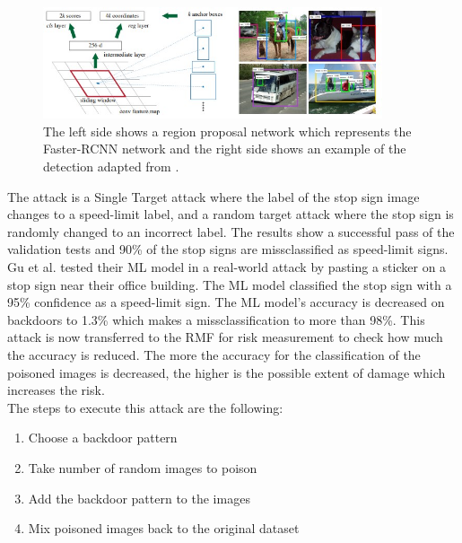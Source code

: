 \begin{figure}[ht!]
  \centering
  \includegraphics[width=10cm]{pictures/f_rcnn.jpg}
  \caption{The left side shows a region proposal network which represents the Faster-RCNN network and the right side shows an example of the detection adapted from \cite{DBLP:conf/nips/RenHGS15}.}
  \label{fig:f_rcnn}
\end{figure}

The attack is a Single Target attack where the label of the stop sign image changes to a speed-limit label, and a random target attack where the stop sign is randomly changed to an incorrect label. The results show a successful pass of the validation tests and 90\% of the stop signs are missclassified as speed-limit signs. Gu et al. tested their ML model in a real-world attack by pasting a sticker on a stop sign near their office building. The ML model classified the stop sign with a 95\% confidence as a speed-limit sign. The ML model's accuracy is decreased on backdoors to 1.3\% which makes a missclassification to more than 98\%. This attack is now transferred to the RMF for risk measurement to check how much the accuracy is reduced. The more the accuracy for the classification of the poisoned images is decreased, the higher is the possible extent of damage which increases the risk. \\

The steps to execute this attack are the following:

\begin{enumerate}
  \item Choose a backdoor pattern
  \item Take number of random images to poison
  \item Add the backdoor pattern to the images
  \item Mix poisoned images back to the original dataset
\end{enumerate}

